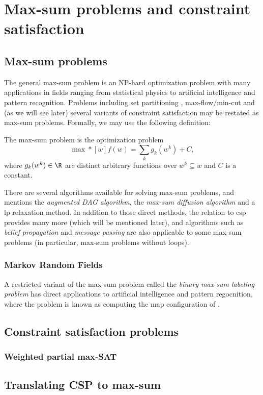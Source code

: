 \section{Max-sum problems and constraint satisfaction}
\subsection{Max-sum problems}
The general max-sum problem is an NP-hard optimization problem with many applications in fields ranging from statistical physics to artificial intelligence and pattern recognition.
Problems including set partitioning \parencite[\pno~107]{Wedelin08}, max-flow/min-cut and (as we will see later) several variants of constraint satisfaction may be restated as max-sum problems.
Formally, we may use the following definition:
\begin{definition} \label{def:max-sum}
	The max-sum problem is the optimization problem
	\begin{equation*}
		\max*[w] f(w) = \sum_k g_k(w^k) + C,
	\end{equation*}
	where \(g_k(w^k) \in \R\) are distinct arbitrary functions over \(w^k \subseteq w\) and \(C\) is a constant.
\end{definition}


There are several algorithms available for solving max-sum problems, and \textcite{Werner07} mentions the \emph{augmented DAG algorithm}, the \emph{max-sum diffusion algorithm} \parencite{Flach98} and a \gls{lp} relaxation method.
In addition to those direct methods, the relation to \gls{csp} provides many more (which will be mentioned later), and algorithms such as \emph{belief propagation} and \emph{message passing} are also applicable to some max-sum problems (in particular, max-sum problems without loops).


\subsubsection{Markov Random Fields}
A restricted variant of the max-sum problem called the \emph{binary max-sum labeling problem} has direct applications to artificial intelligence and pattern regocnition, where the problem is known as computing the \gls{map} configuration of  \parencite[\pno~1165]{Werner07}.


\subsection{Constraint satisfaction problems}

\subsubsection{Weighted partial max-SAT}

\subsection{Translating CSP to max-sum}
